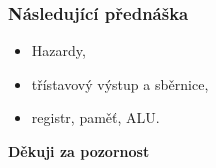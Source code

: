   \begin{frame}
    \frametitle{Následující přednáška}
		
		
		\begin{itemize}
			\item Hazardy,
			\item třístavový výstup a sběrnice,
			\item registr, paměť, ALU.
		\end{itemize}
		
		\begin{center}
			\textbf{Děkuji za pozornost}
		\end{center}
		
	\end{frame}
